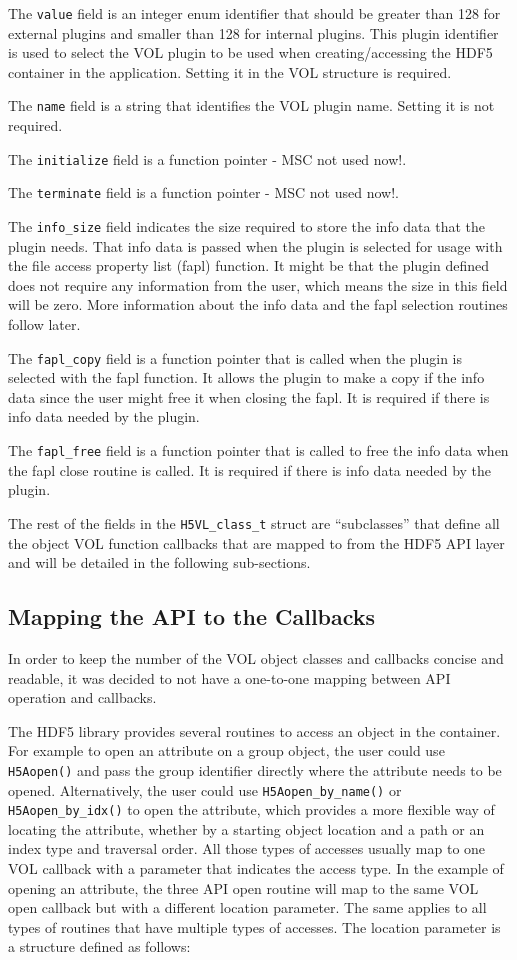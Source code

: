 \documentclass[10pt,a4paper]{article}
\begin{document}
The {\tt value} field is an integer enum identifier that should be
greater than 128 for external plugins and smaller than 128 for
internal plugins. This plugin identifier is used to select the VOL
plugin to be used when creating/accessing the HDF5 container in the
application. Setting it in the VOL structure is required.

The {\tt name} field is a string that identifies the VOL plugin
name. Setting it is not required.

The {\tt initialize} field is a function pointer - MSC not used now!.

The {\tt terminate} field is a function pointer - MSC not used now!.

The {\tt info\_size} field indicates the size required to store the
info data that the plugin needs. That info data is passed when the
plugin is selected for usage with the file access property list (fapl)
function. It might be that the plugin defined does not require any
information from the user, which means the size in this field will be
zero. More information about the info data and the fapl selection
routines follow later.

The {\tt fapl\_copy} field is a function pointer that is called when
the plugin is selected with the fapl function. It allows the plugin to
make a copy if the info data since the user might free it when closing
the fapl. It is required if there is info data needed by the plugin.

The {\tt fapl\_free} field is a function pointer that is called to
free the info data when the fapl close routine is called. It is
required if there is info data needed by the plugin.

The rest of the fields in the {\tt H5VL\_class\_t} struct are
``subclasses'' that define all the object VOL function callbacks that
are mapped to from the HDF5 API layer and will be detailed in the
following sub-sections.

\subsection{Mapping the API to the Callbacks}
In order to keep the number of the VOL object classes and callbacks
concise and readable, it was decided to not have a one-to-one mapping
between API operation and callbacks.

The HDF5 library provides several routines to access an object in the
container. For example to open an attribute on a group object, the
user could use {\tt H5Aopen()} and pass the group identifier directly
where the attribute needs to be opened. Alternatively, the user could
use {\tt H5Aopen\_by\_name()} or {\tt H5Aopen\_by\_idx()} to open the
attribute, which provides a more flexible way of locating the
attribute, whether by a starting object location and a path or an
index type and traversal order. All those types of accesses usually
map to one VOL callback with a parameter that indicates the access
type. In the example of opening an attribute, the three API open
routine will map to the same VOL open callback but with a different
location parameter. The same applies to all types of routines that
have multiple types of accesses.  The location parameter is a
structure defined as follows:
\end{document}
